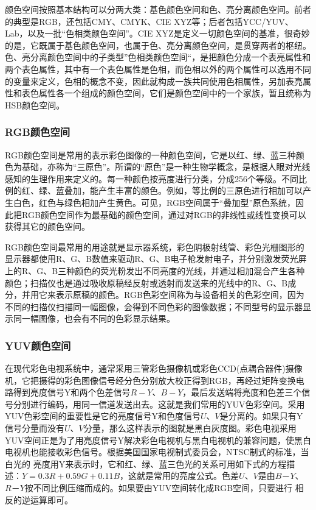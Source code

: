 \documentclass[12pt]{article}
\begin{document}
颜色空间按照基本结构可以分两大类：基色颜色空间和色、亮分离颜色空间。前者的典型是RGB，还包括CMY、CMYK、CIE XYZ等；后者包括YCC/YUV、Lab，以及一批“色相类颜色空间”。CIE XYZ是定义一切颜色空间的基准，很奇妙的是，它既属于基色颜色空间，也属于色、亮分离颜色空间，是贯穿两者的枢纽。色、亮分离颜色空间中的子类型”色相类颜色空间“，是把颜色分成一个表亮属性和两个表色属性，其中有一个表色属性是色相，而色相以外的两个属性可以选用不同的变量来定义，色相的概念不变，因此就构成一族共同使用色相属性，另加表亮属性和表色属性各一个组成的颜色空间，它们是颜色空间中的一个家族，暂且统称为HSB颜色空间。

\subsubsection{RGB颜色空间}

RGB颜色空间是常用的表示彩色图像的一种颜色空间，它是以红、绿、蓝三种颜色为基础，亦称为“三原色”。所谓的“原色”是一种生物学概念，是根据人眼对光线感知的生理作用来定义的。每一种颜色按亮度进行分类，分成256个等级。不同比例的红、绿、蓝叠加，能产生丰富的颜色。例如，等比例的三原色进行相加可以产生白色，红色与绿色相加产生黄色。可见，RGB空间属于“叠加型”原色系统，因此把RGB颜色空间作为最基础的颜色空间，通过对RGB的非线性或线性变换可以获得其它的颜色空间。

RGB颜色空间最常用的用途就是显示器系统，彩色阴极射线管、彩色光栅图形的显示器都使用R、G、B数值来驱动R、G、B电子枪发射电子，并分别激发荧光屏上的R、G、B三种颜色的荧光粉发出不同亮度的光线，并通过相加混合产生各种颜色；扫描仪也是通过吸收原稿经反射或透射而发送来的光线中的R、G、B成分，并用它来表示原稿的颜色。RGB色彩空间称为与设备相关的色彩空间，因为不同的扫描仪扫描同一幅图像，会得到不同色彩的图像数据；不同型号的显示器显示同一幅图像，也会有不同的色彩显示结果。

\subsubsection{YUV颜色空间}

在现代彩色电视系统中，通常采用三管彩色摄像机或彩色CCD(点耦合器件)摄像机，它把摄得的彩色图像信号经分色分别放大校正得到RGB，再经过矩阵变换电路得到亮度信号Y和两个色差信号$R-Y$、$B-Y$，最后发送端将亮度和色差三个信号分别进行编码，用同一信道发送出去。这就是我们常用的YUV色彩空间。采用YUV色彩空间的重要性是它的亮度信号Y和色度信号$U$、$V$是分离的。如果只有Y信号分量而没有$U$、$V$分量，那么这样表示的图就是黑白灰度图。彩色电视采用YUV空间正是为了用亮度信号Y解决彩色电视机与黑白电视机的兼容问题，使黑白电视机也能接收彩色信号。根据美国国家电视制式委员会，NTSC制式的标准，当白光的 亮度用Y来表示时，它和红、绿、蓝三色光的关系可用如下式的方程描述：$Y=0.3R+0.59G+0.11B$，这就是常用的亮度公式。色差$U$、$V$是由$B－Y$、$R－Y$按不同比例压缩而成的。如果要由YUV空间转化成RGB空间，只要进行 相反的逆运算即可。
\end{document}
